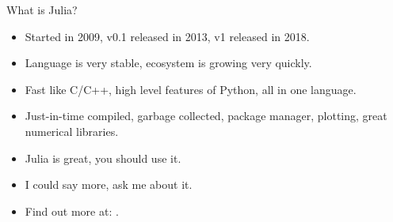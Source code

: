 \begin{frame}{What is Julia?}

\begin{itemize}[<+->]

  \item Started in 2009, v0.1 released in 2013, v1 released in 2018.
  \item Language is very stable, ecosystem is growing very quickly.
  \item Fast like C/C++, high level features of Python, all in one language.
  \item Just-in-time compiled, garbage collected, package manager, plotting, great numerical libraries.
  \item Julia is great, you should use it.
  \item I could say more, ask me about it.
  \item Find out more at: .

\end{itemize}


\end{frame}
